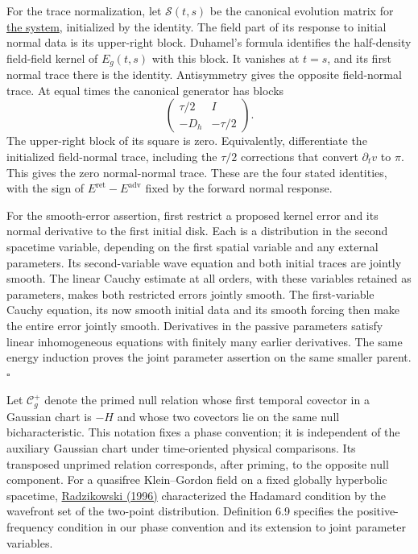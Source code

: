 \documentclass[
  english,
  11pt,
  reqno]{amsart}
\begin{document}
For the trace normalization, let \(\mathcal S(t,s)\) be the canonical
evolution matrix for
\hyperref[eq:online-wave-canonical-cauchy-system]{the system},
initialized by the identity. The field part of its response to initial
normal data is its upper-right block. Duhamel's formula identifies the
half-density field-field kernel of \(E_g(t,s)\) with this block. It
vanishes at \(t=s\), and its first normal trace there is the identity.
Antisymmetry gives the opposite field-normal trace. At equal times the
canonical generator has blocks \[
\begin{pmatrix}\tau/2&I\\-D_h&-\tau/2\end{pmatrix}.
\] The upper-right block of its square is zero. Equivalently,
differentiate the initialized field-normal trace, including the
\(\tau/2\) corrections that convert \(\partial_t v\) to \(\pi\). This
gives the zero normal-normal trace. These are the four stated
identities, with the sign of \(E^{\mathrm{ret}}-E^{\mathrm{adv}}\) fixed
by the forward normal response.

For the smooth-error assertion, first restrict a proposed kernel error
and its normal derivative to the first initial disk. Each is a
distribution in the second spacetime variable, depending on the first
spatial variable and any external parameters. Its second-variable wave
equation and both initial traces are jointly smooth. The linear Cauchy
estimate at all orders, with these variables retained as parameters,
makes both restricted errors jointly smooth. The first-variable Cauchy
equation, its now smooth initial data and its smooth forcing then make
the entire error jointly smooth. Derivatives in the passive parameters
satisfy linear inhomogeneous equations with finitely many earlier
derivatives. The same energy induction proves the joint parameter
assertion on the same smaller parent. \hfill\(\square\)

Let \(\mathcal C_g^+\) denote the primed null relation whose first
temporal covector in a Gaussian chart is \(-H\) and whose two covectors
lie on the same null bicharacteristic. This notation fixes a phase
convention; it is independent of the auxiliary Gaussian chart under
time-oriented physical comparisons. Its transposed unprimed relation
corresponds, after priming, to the opposite null component. For a
quasifree Klein--Gordon field on a fixed globally hyperbolic spacetime,
\hyperref[ref-Radzikowski1996]{Radzikowski (1996)} characterized the
Hadamard condition by the wavefront set of the two-point distribution.
Definition 6.9 specifies the positive-frequency condition in our phase
convention and its extension to joint parameter variables.
\end{document}
